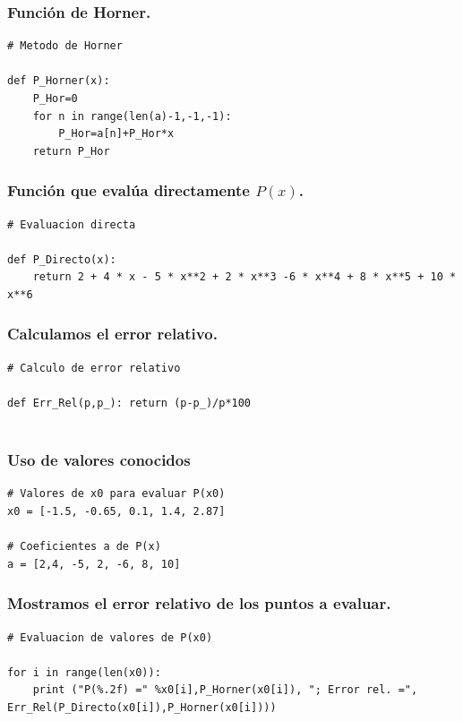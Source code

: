 \begin{frame}[fragile]
\frametitle{Función de Horner.}
\fontsize{14}{14}\selectfont
\begin{lstlisting}[caption=Código para la función de Horner, basicstyle=\linespread{1.2}\ttfamily\small, columns=fullflexible]
# Metodo de Horner

def P_Horner(x):
    P_Hor=0
    for n in range(len(a)-1,-1,-1):     
        P_Hor=a[n]+P_Hor*x
    return P_Hor
\end{lstlisting}
\end{frame}
\begin{frame}[fragile]
\frametitle{Función que evalúa directamente $P(x)$.}
\fontsize{14}{14}\selectfont
\begin{lstlisting}[caption=Evaluación directa de la función, basicstyle=\linespread{1.2}\ttfamily\small, columns=fullflexible]
# Evaluacion directa

def P_Directo(x):
    return 2 + 4 * x - 5 * x**2 + 2 * x**3 -6 * x**4 + 8 * x**5 + 10 * x**6
\end{lstlisting}
\end{frame}
\begin{frame}[fragile]
\frametitle{Calculamos el error relativo.}
\fontsize{14}{14}\selectfont
\begin{lstlisting}[caption=Evaluación del error relativo, basicstyle=\linespread{1.2}\ttfamily\small, columns=fullflexible]
# Calculo de error relativo

def Err_Rel(p,p_): return (p-p_)/p*100
    
\end{lstlisting}
\end{frame}
\begin{frame}[fragile]
\frametitle{Uso de valores conocidos}
\begin{lstlisting}[caption=Valores conocidos, basicstyle=\linespread{1.2}\ttfamily\small, columns=fullflexible]
# Valores de x0 para evaluar P(x0)
x0 = [-1.5, -0.65, 0.1, 1.4, 2.87]

# Coeficientes a de P(x)
a = [2,4, -5, 2, -6, 8, 10]
\end{lstlisting}
\end{frame}
\begin{frame}[fragile]
\frametitle{Mostramos el error relativo de los puntos a evaluar.}
\fontsize{14}{14}\selectfont
\begin{lstlisting}[caption=Error relativo calculado, basicstyle=\linespread{1.2}\ttfamily\small, columns=fullflexible]
# Evaluacion de valores de P(x0)

for i in range(len(x0)):                 
    print ("P(%.2f) =" %x0[i],P_Horner(x0[i]), "; Error rel. =", Err_Rel(P_Directo(x0[i]),P_Horner(x0[i])))
\end{lstlisting}
\end{frame}
